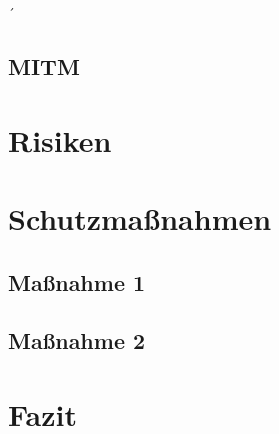 ´\documentclass[
    a4paper,
    pagesize,
    pdftex,
    12pt,
]{scrartcl}
\begin{document}
    \subsection{MITM}

    \newpage
    \section{Risiken}

    \newpage
    \section{Schutzmaßnahmen}
\subsection{Maßnahme 1}
\subsection{Maßnahme 2}

    \newpage
\section{Fazit}

    \newpage

    
    
\end{document}
